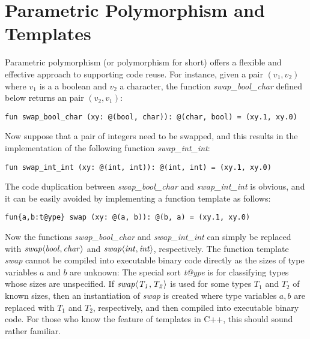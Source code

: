 \section{Parametric Polymorphism and Templates}
Parametric polymorphism (or polymorphism for short) offers a flexible and
effective approach to supporting code reuse. For instance, given a pair $(v_1,
v_2)$ where $v_1$ is a a boolean and $v_2$ a character, the function {\it
swap\_bool\_char} defined below returns an pair $(v_2, v_1)$:
\begin{verbatim}
fun swap_bool_char (xy: @(bool, char)): @(char, bool) = (xy.1, xy.0)
\end{verbatim}
Now suppose that a pair of integers need to be swapped, and this results in
the implementation of the following function {\it swap\_int\_int}:
\begin{verbatim}
fun swap_int_int (xy: @(int, int)): @(int, int) = (xy.1, xy.0)
\end{verbatim}
The code duplication between {\it swap\_bool\_char} and {\it
swap\_int\_int} is obvious, and it can be easily avoided by implementing a
function template as follows:
\begin{verbatim}
fun{a,b:t@ype} swap (xy: @(a, b)): @(b, a) = (xy.1, xy.0)
\end{verbatim}
Now the functions {\it swap\_bool\_char} and {\it swap\_int\_int} can
simply be replaced with ${\it swap\langle bool,char\rangle}$ and ${\it
swap\langle int,int\rangle}$, respectively. The function template {\it
swap} cannot be compiled into executable binary code directly as the sizes
of type variables $a$ and $b$ are unknown: The special sort {\it t@ype} is
for classifying types whose sizes are unspecified. If ${\it swap\langle
T_1,T_2\rangle}$ is used for some types $T_1$ and $T_2$ of known sizes,
then an instantiation of {\it swap} is created where type variables $a,b$
are replaced with $T_1$ and $T_2$, respectively, and then compiled into
executable binary code. For those who know the feature of templates in C++,
this should sound rather familiar.

